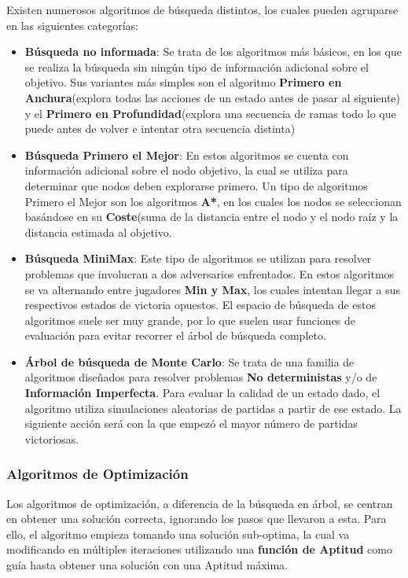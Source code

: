 Existen numerosos algoritmos de búsqueda distintos, los cuales pueden agruparse en las siguientes categorías:
\begin{itemize}
\item \textbf{Búsqueda no informada}: Se trata de los algoritmos más básicos, en los que se realiza la búsqueda sin ningún tipo de información adicional sobre el objetivo. Sus variantes más simples son el algoritmo \textbf{Primero en Anchura}(explora todas las acciones de un estado antes de pasar al siguiente) y el \textbf{Primero en Profundidad}(explora una secuencia de ramas todo lo que puede antes de volver e intentar otra secuencia distinta)
\item \textbf{Búsqueda Primero el Mejor}: En estos algoritmos se cuenta con información adicional sobre el nodo objetivo, la cual se utiliza para determinar que nodos deben explorarse primero. Un tipo de algoritmos Primero el Mejor son los algoritmos \textbf{A*}, en los cuales los nodos se seleccionan basándose en su \textbf{Coste}(suma de la distancia entre el nodo y el nodo raíz y la distancia estimada al objetivo.
\item \textbf{Búsqueda MiniMax}: Este tipo de algoritmos se utilizan para resolver problemas que involucran a dos adversarios enfrentados. En estos algoritmos se va alternando entre jugadores \textbf{Min y Max}, los cuales intentan llegar a sus respectivos estados de victoria opuestos. El espacio de búsqueda de estos algoritmos suele ser muy grande, por lo que suelen usar funciones de evaluación para evitar recorrer el árbol de búsqueda completo.
\item \textbf{Árbol de búsqueda de Monte Carlo}: Se trata de una familia de algoritmos diseñados para resolver problemas \textbf{No deterministas} y/o de \textbf{Información Imperfecta}. Para evaluar la calidad de un estado dado, el algoritmo utiliza simulaciones aleatorias de partidas a partir de ese estado. La siguiente acción será con la que empezó el mayor número de partidas victoriosas.
\end{itemize} 

\subsubsection{Algoritmos de Optimización}
Los algoritmos de optimización, a diferencia de la búsqueda en árbol, se centran en obtener una solución correcta, ignorando los pasos que llevaron a esta. Para ello, el algoritmo empieza tomando una solución sub-optima, la cual va modificando en múltiples iteraciones utilizando una \textbf{función de Aptitud} como guía hasta obtener una solución con una Aptitud máxima\cite{ai_and_games}.

